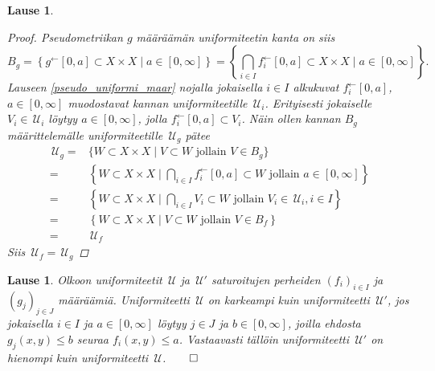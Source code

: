 \documentclass[12pt,a4paper,leqno]{report}
\newcommand{\U}{\,\mathcal{U}}
\theoremstyle{plain}
\newtheorem{lause}[equation]{Lause}
\theoremstyle{definition}
\theoremstyle{remark}
\begin{document}
\begin{lause}
\begin{proof}
%
Pseudometriikan $g
$
määräämän uniformiteetin kanta on siis
$$B_g=\left\{g^\leftarrow[0,a]\subset X\times X\mid a\in[0,\infty]\right\}
=\left\{\bigcap_{i\in I} f_i^\leftarrow[0,a]\subset X\times X\mid a\in[0,\infty]\right\}.$$
Lauseen \ref{pseudo_uniformi_maar} nojalla jokaisella $i\in I$ 
alkukuvat $f_i^\leftarrow[0,a]$, $a\in[0,\infty]$ 
muodostavat kannan uniformiteetille $\U_i$. 
Erityisesti jokaiselle $V_i\in\U_i$ löytyy $a\in [0,\infty]$, 
jolla $ f_i^\leftarrow[0,a]\subset V_i$.
Näin ollen kannan $B_g$ määrittelemälle uniformiteetille $\U_g$ pätee 
\begin{equation*}
\begin{split}
\U_g=&\{W\subset X\times X\mid V\subset W\text{ jollain }V\in B_g\}\\
=&\left\{W\subset X\times X\mid \bigcap_{i\in I} f_i^\leftarrow[0,a]\subset W\text{ jollain }a\in[0,\infty]\right\}\\
=&\left\{W\subset X\times X\mid \bigcap_{i\in I} V_i\subset W\text{ jollain }V_i\in \U_i,i\in I\right\}\\
=&\left\{W\subset X\times X\mid V\subset W\text{ jollain }V\in B_f\right\}\\
=&\U_f
\end{split}
\end{equation*}
Siis $\U_{f}= \U_{g}$ 
\end{proof}
\end{lause}
\begin{lause}
Olkoon uniformiteetit $\U$ ja $\U'$ saturoitujen perheiden 
$(f_i)_{i\in I}$ ja $(g_j)_{j\in J}$ määräämiä. 
Uniformiteetti $\U$ on karkeampi kuin uniformiteetti $\U'$, 
jos jokaisella $i\in I$ ja $a\in[0,\infty]$ löytyy $j\in J$ ja $b\in[0,\infty]$, 
joilla ehdosta $g_j(x,y)\leq b$ seuraa $f_i(x,y)\leq a$. 
Vastaavasti tällöin uniformiteetti $\U'$ on hienompi kuin uniformiteetti $\U$.$\qed$
\end{lause}
\end{document}
